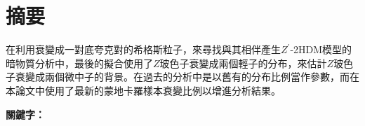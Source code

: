 \documentclass[class=NTHU_thesis, crop=false]{standalone}
\begin{document}
\setlength{\parindent}{2em} %

\chapter{摘要}
在利用衰變成一對底夸克對的希格斯粒子，來尋找與其相伴產生$Z^\prime$-2HDM模型的暗物質分析中，最後的擬合使用了$Z$玻色子衰變成兩個輕子的分布，來估計$Z$玻色子衰變成兩個微中子的背景。在過去的分析中是以舊有的分布比例當作參數，而在本論文中使用了最新的蒙地卡羅樣本衰變比例以增進分析結果。

\vspace{2em}
\noindent \textbf{關鍵字：} \keywordsZh{} %
\end{document}
